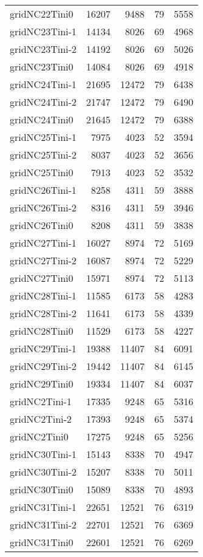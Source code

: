 \documentclass[../../../thesis.tex]{subfiles}
\begin{document}
\begin{longtable}{lrrrr}
gridNC22Tini0 & 16207 & 9488 & 79 & 5558 \\
gridNC23Tini-1 & 14134 & 8026 & 69 & 4968 \\
gridNC23Tini-2 & 14192 & 8026 & 69 & 5026 \\
gridNC23Tini0 & 14084 & 8026 & 69 & 4918 \\
gridNC24Tini-1 & 21695 & 12472 & 79 & 6438 \\
gridNC24Tini-2 & 21747 & 12472 & 79 & 6490 \\
gridNC24Tini0 & 21645 & 12472 & 79 & 6388 \\
gridNC25Tini-1 & 7975 & 4023 & 52 & 3594 \\
gridNC25Tini-2 & 8037 & 4023 & 52 & 3656 \\
gridNC25Tini0 & 7913 & 4023 & 52 & 3532 \\
gridNC26Tini-1 & 8258 & 4311 & 59 & 3888 \\
gridNC26Tini-2 & 8316 & 4311 & 59 & 3946 \\
gridNC26Tini0 & 8208 & 4311 & 59 & 3838 \\
gridNC27Tini-1 & 16027 & 8974 & 72 & 5169 \\
gridNC27Tini-2 & 16087 & 8974 & 72 & 5229 \\
gridNC27Tini0 & 15971 & 8974 & 72 & 5113 \\
gridNC28Tini-1 & 11585 & 6173 & 58 & 4283 \\
gridNC28Tini-2 & 11641 & 6173 & 58 & 4339 \\
gridNC28Tini0 & 11529 & 6173 & 58 & 4227 \\
gridNC29Tini-1 & 19388 & 11407 & 84 & 6091 \\
gridNC29Tini-2 & 19442 & 11407 & 84 & 6145 \\
gridNC29Tini0 & 19334 & 11407 & 84 & 6037 \\
gridNC2Tini-1 & 17335 & 9248 & 65 & 5316 \\
gridNC2Tini-2 & 17393 & 9248 & 65 & 5374 \\
gridNC2Tini0 & 17275 & 9248 & 65 & 5256 \\
gridNC30Tini-1 & 15143 & 8338 & 70 & 4947 \\
gridNC30Tini-2 & 15207 & 8338 & 70 & 5011 \\
gridNC30Tini0 & 15089 & 8338 & 70 & 4893 \\
gridNC31Tini-1 & 22651 & 12521 & 76 & 6319 \\
gridNC31Tini-2 & 22701 & 12521 & 76 & 6369 \\
gridNC31Tini0 & 22601 & 12521 & 76 & 6269 \\

\end{longtable}
\end{document}
